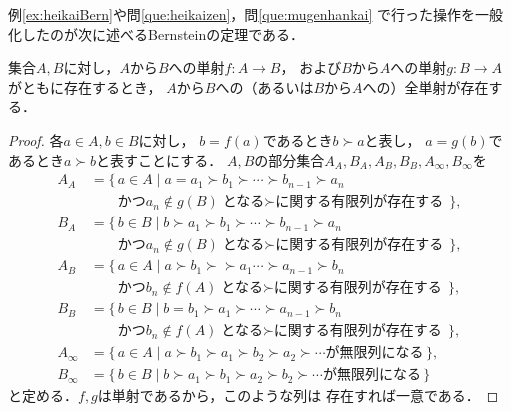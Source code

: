    例\ref{ex:heikaiBern}や問\ref{que:heikaizen}，問\ref{que:mugenhankai}
   で行った操作を一般化したのが次に述べるBernsteinの定理である．

   \begin{thm}[Bernsteinの定理] \label{thm:Bernstein}
     集合$A,B$に対し，$A$から$B$への単射$f:A \longrightarrow B$，
     および$B$から$A$への単射$g: B \longrightarrow A$がともに存在するとき，
     $A$から$B$への（あるいは$B$から$A$への）全単射が存在する．
   \end{thm}

   \begin{proof}
     各$a \in A ,  b \in B$に対し，
     $b=f(a)$であるとき$b \succ a$と表し，
     $a=g(b)$であるとき$a \succ b$と表すことにする．
     $A,B$の部分集合$A_A, B_A , A_B, B_B , A_{\infty} , B_{\infty}$を
     \begin{align*}
       A_A & = \{ \,  a \in A \mid a=a_1 \succ b_1 \succ \cdots \succ b_{n-1} \succ a_n \\
           & \qquad \text{かつ} a_n \notin g(B) 
             \text{となる$\succ$に関する有限列が存在する} \, \} , \\
       B_A & = \{ \, b \in B \mid b \succ a_1 \succ b_1 \succ \cdots \succ b_{n-1} \succ a_n \\
           & \qquad \text{かつ} a_n \notin g(B) 
             \text{となる$\succ$に関する有限列が存在する} \, \} , \\
       A_B & = \{ \,  a \in A \mid a \succ b_1 \succ \succ a_1 \cdots \succ a_{n-1} \succ b_n \\
           & \qquad \text{かつ} b_n \notin f(A) 
             \text{となる$\succ$に関する有限列が存在する} \, \} , \\
       B_B & = \{ \, b \in B \mid b=b_1 \succ a_1 \succ \cdots \succ a_{n-1} \succ b_n \\
           & \qquad \text{かつ} b_n \notin f(A) 
             \text{となる$\succ$に関する有限列が存在する} \, \} , \\
       A_{\infty} & = \{ \, a \in A \mid a \succ b_1 \succ a_1 \succ b_2 \succ a_2 \succ \cdots
                        \text{が無限列になる} \, \} , \\
       B_{\infty} & = \{ \, b \in B \mid b \succ a_1 \succ b_1 \succ a_2 \succ b_2 \succ \cdots
                        \text{が無限列になる} \, \}
     \end{align*}
     と定める．$f,g$は単射であるから，このような列は
     存在すれば一意である．


\end{proof}
